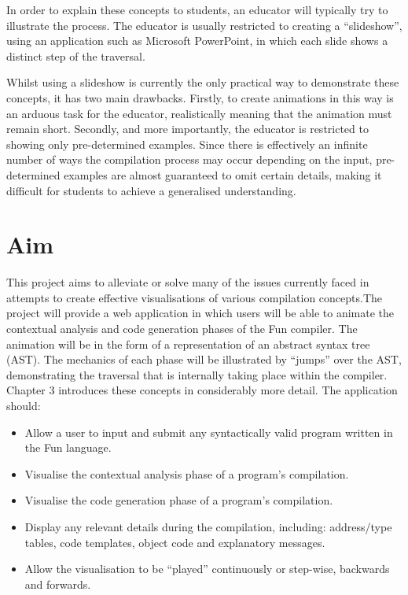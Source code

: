 \documentclass{l4proj}
\begin{document}
In order to explain these concepts to students, an educator will typically try to illustrate the process. The educator is usually restricted to creating a ``slideshow'', using an application such as Microsoft PowerPoint, in which each slide shows a distinct step of the traversal. 

Whilst using a slideshow is currently the only practical way to demonstrate these concepts, it has two main drawbacks. Firstly, to create animations in this way is an arduous task for the educator, realistically meaning that the animation must remain short. Secondly, and more importantly, the educator is restricted to showing only pre-determined examples. Since there is effectively an infinite number of ways the compilation process may occur depending on the input, pre-determined examples are almost guaranteed to omit certain details, making it difficult for students to achieve a generalised understanding.

\section{Aim}
This project aims to alleviate or solve many of the issues currently faced in attempts to create effective visualisations of various compilation concepts.The project will provide a web application in which users will be able to animate the contextual analysis and code generation phases of the Fun compiler. The animation will be in the form of a representation of an abstract syntax tree (AST). The mechanics of each phase will be illustrated by ``jumps'' over the AST, demonstrating the traversal that is internally taking place within the compiler. Chapter 3 introduces these concepts in considerably more detail. The application should:
\begin{itemize}
\item Allow a user to input and submit any syntactically valid program written in the Fun language.
\item Visualise the contextual analysis phase of a program's compilation. 
\item Visualise the code generation phase of a program's compilation.
\item Display any relevant details during the compilation, including: address/type tables, code templates, object code and explanatory messages.
\item Allow the visualisation to be ``played'' continuously or step-wise, backwards and forwards.
\end{itemize}
\end{document}
